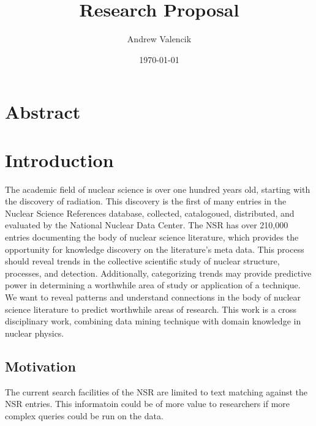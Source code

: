 \documentclass[12pt]{article}
\begin{document}
\title{Research Proposal}
\author{Andrew Valencik}
\date{\today}
\maketitle
\tableofcontents
\begin{doublespacing}


\pagebreak
\section{Abstract}

\pagebreak
\section{Introduction}

The academic field of nuclear science is over one hundred years old, starting with the discovery of radiation.
This discovery is the first of many entries in the Nuclear Science References database, collected, catalogoued, distributed, and evaluated by the National Nuclear Data Center. \citep{Kurgan200603} 
The NSR has over 210,000 entries documenting the body of nuclear science literature, which provides the opportunity for knowledge discovery on the literature's meta data.
This process should reveal trends in the collective scientific study of nuclear structure, processes, and detection.
Additionally, categorizing trends may provide predictive power in determining a worthwhile area of study or application of a technique.
We want to reveal patterns and understand connections in the body of nuclear science literature to predict worthwhile areas of research.
This work is a cross disciplinary work, combining data mining technique with domain knowledge in nuclear physics. 


\subsection{Motivation}
The current search facilities of the NSR are limited to text matching against the NSR entries.
This informatoin could be of more value to researchers if more complex queries could be run on the data.


\end{doublespacing}
\end{document}
